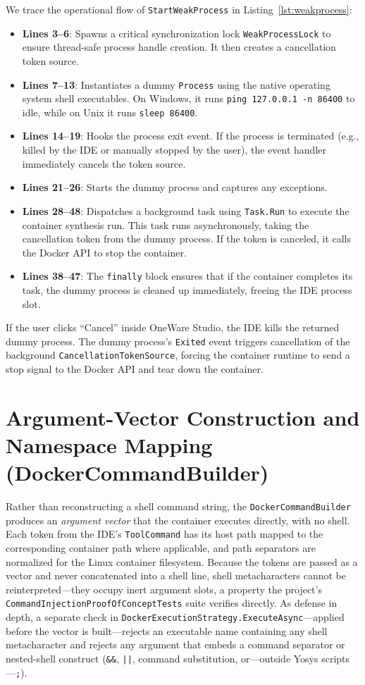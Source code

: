 We trace the operational flow of \texttt{StartWeakProcess} in Listing~\ref{lst:weakprocess}:
\begin{itemize}
    \item \textbf{Lines 3--6}: Spawns a critical synchronization lock \texttt{WeakProcessLock} to ensure thread-safe process handle creation. It then creates a cancellation token source.
    \item \textbf{Lines 7--13}: Instantiates a dummy \texttt{Process} using the native operating system shell executables. On Windows, it runs \texttt{ping 127.0.0.1 -n 86400} to idle, while on Unix it runs \texttt{sleep 86400}.
    \item \textbf{Lines 14--19}: Hooks the process exit event. If the process is terminated (e.g., killed by the IDE or manually stopped by the user), the event handler immediately cancels the token source.
    \item \textbf{Lines 21--26}: Starts the dummy process and captures any exceptions.
    \item \textbf{Lines 28--48}: Dispatches a background task using \texttt{Task.Run} to execute the container synthesis run. This task runs asynchronously, taking the cancellation token from the dummy process. If the token is canceled, it calls the Docker API to stop the container.
    \item \textbf{Lines 38--47}: The \texttt{finally} block ensures that if the container completes its task, the dummy process is cleaned up immediately, freeing the IDE process slot.
\end{itemize}

If the user clicks ``Cancel'' inside OneWare Studio, the IDE kills the returned dummy process. The dummy process's \texttt{Exited} event triggers cancellation of the background \texttt{Cancellation\-Token\-Source}, forcing the container runtime to send a stop signal to the Docker API and tear down the container.

\section{Argument-Vector Construction and Namespace Mapping (DockerCommandBuilder)}
Rather than reconstructing a shell command string, the \texttt{Docker\-Command\-Builder} produces an \emph{argument vector} that the container executes directly, with no shell. Each token from the IDE's \texttt{ToolCommand} has its host path mapped to the corresponding container path where applicable, and path separators are normalized for the Linux container filesystem. Because the tokens are passed as a vector and never concatenated into a shell line, shell metacharacters cannot be reinterpreted---they occupy inert argument slots, a property the project's \texttt{CommandInjectionProofOfConceptTests} suite verifies directly. As defense in depth, a separate check in \texttt{DockerExecutionStrategy.ExecuteAsync}---applied before the vector is built---rejects an executable name containing any shell metacharacter and rejects any argument that embeds a command separator or nested-shell construct (\texttt{\&\&}, \texttt{||}, command substitution, or---outside Yosys scripts---\texttt{;}).

